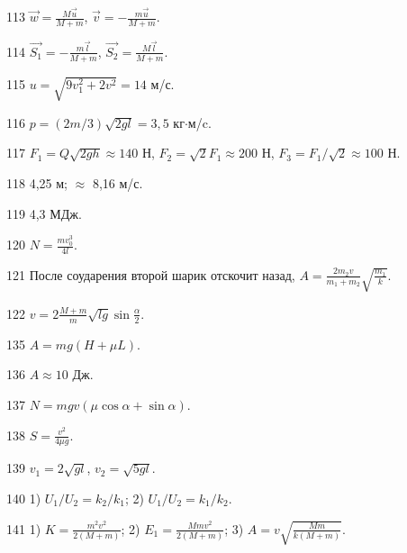 \begin{Answer}{113}
$\vec{w} = \frac{M\vec{u}}{M+m}$, $\vec{v} = -\frac{m\vec{u}}{M+m}$.
\end{Answer}
\begin{Answer}{114}
$\vec{S_1} = -\frac{m\vec{l}}{M+m}$, $\vec{S_2} = \frac{M\vec{l}}{M+m}$.
\end{Answer}
\begin{Answer}{115}
$u = \sqrt{9v_{1}^2 + 2v^2} = 14$ м/с.
\end{Answer}
\begin{Answer}{116}
$p = (2m/3)\sqrt{2gl} = 3,5$ кг$\cdot$м/c.
\end{Answer}
\begin{Answer}{117}
$F_1 = Q\sqrt{2gh} \approx 140$ Н, $F_2 = \sqrt{2} F_1 \approx 200$ Н, $F_3 = F_1/\sqrt{2} \approx 100$ Н.
\end{Answer}
\begin{Answer}{118}
4,25 м; $\approx$ 8,16 м/с.
\end{Answer}
\begin{Answer}{119}
4,3 МДж.
\end{Answer}
\begin{Answer}{120}
$N =\frac{mv_{0}^3}{4l}$.
\end{Answer}
\begin{Answer}{121}
После соударения второй шарик отскочит назад, $A = \frac{2m_2v}{m_1+m_2}\sqrt{\frac{m_1}{k}}$.
\end{Answer}
\begin{Answer}{122}
$v = 2\frac{M+m}{m}\sqrt{lg}\sin \frac{\alpha}{2}$.
\end{Answer}
\begin{Answer}{135}
$A=mg(H+\mu L)$.
\end{Answer}
\begin{Answer}{136}
$A \approx 10$ Дж.
\end{Answer}
\begin{Answer}{137}
$N = mgv(\mu \cos \alpha +\sin \alpha)$.
\end{Answer}
\begin{Answer}{138}
$S = \frac{v^2}{4 \mu g}$.
\end{Answer}
\begin{Answer}{139}
$v_1 = 2\sqrt{gl}$, $v_2 = \sqrt{5gl}$.
\end{Answer}
\begin{Answer}{140}
1) $U_1/U_2 = k_2/k_1$; 2) $U_1/U_2 = k_1/k_2$.
\end{Answer}
\begin{Answer}{141}
1) $K=\frac{m^2v^2}{2(M+m)}$; 2) $E_1 = \frac{Mmv^2}{2(M+m)}$; 3) $A = v\sqrt{\frac{Mm}{k(M+m)}}$.
\end{Answer}
